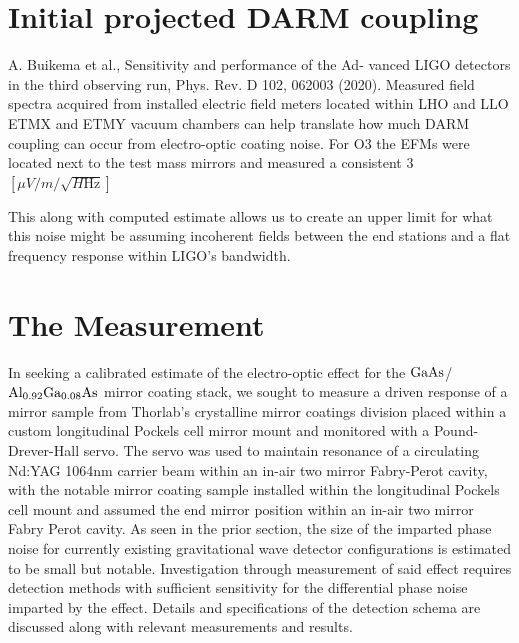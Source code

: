 \section{Initial projected DARM coupling}
A. Buikema et al., Sensitivity and performance of the Ad-
vanced LIGO detectors in the third observing run, Phys.
Rev. D 102, 062003 (2020).
Measured field spectra acquired from installed electric field meters located within LHO and LLO ETMX and ETMY vacuum chambers can help translate how much DARM coupling can occur from electro-optic coating noise. For O3 the EFMs were located next to the test mass mirrors and measured a consistent 3 $[\mu V / m / \sqrt{H\mathrm{Hz}}]$

This along with computed estimate allows us to create an upper limit for what this noise might be assuming incoherent fields between the end stations and a flat frequency response within LIGO's bandwidth.

\section{The Measurement}
 In seeking a calibrated estimate of the electro-optic effect for the $\mathrm{GaAs}$/$\mathrm{Al_{0.92}Ga_{0.08}As}$ mirror coating stack, we sought to measure a driven response of a mirror sample from Thorlab's crystalline mirror coatings division placed within a custom longitudinal Pockels cell mirror mount and monitored with a Pound-Drever-Hall servo. The servo was used to maintain resonance of a circulating Nd:YAG 1064nm carrier beam within an in-air two mirror Fabry-Perot cavity, with the notable mirror coating sample installed within the longitudinal Pockels cell mount and assumed the end mirror position within an in-air two mirror Fabry Perot cavity. As seen in the prior section, the size of the imparted phase noise for currently existing gravitational wave detector configurations is estimated to be small but notable. Investigation through measurement of said effect requires detection methods with sufficient sensitivity for the differential phase noise imparted by the effect. Details and specifications of the detection schema are discussed along with relevant measurements and results. 

